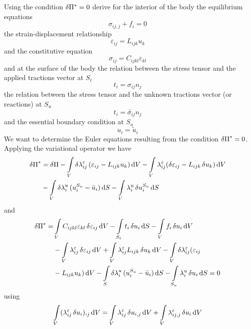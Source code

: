 Using the condition $\var{\Pi^*} = 0$ derive for the interior of the body the equilibrium equations
\[\sigma_{ij,j} + f_i = 0\]
the strain-displacement relationship
\[\varepsilon_{ij} = L_{ijk} u_k\]
and the constitutive equation
\[\sigma_{ij} = C_{ijkl} \varepsilon_{kl}\]
and at the surface of the body the relation between the stress tensor and the applied tractions vector at $S_t$
\[t_i = \sigma_{ij} n_j\]
the relation between the stress tensor and the unknown tractions vector (or reactions) at $S_u$
\[t_i = \tilde{\sigma_{ij}} n_j\]
and the essential boundary condition at $S_u$
\[u_i = \tilde{u}_i\]
We want to determine the Euler equations resulting from the condition $\var{\Pi}^* = 0$. Applying the variational operator we have
\begin{equation}
\begin{aligned}
\var{\Pi}^*& = \var{\Pi}  - \int\limits_V \var{\lambda}_{ij}^{\varepsilon}  (\varepsilon_{ij} - L_{ijk} u_k)\dd{V}- \int\limits_V \lambda_{ij}^\varepsilon (\var{\varepsilon}_{ij} - L_{ijk}\var{u}_k)\dd{V} \\
&-\int\limits_V \var{\lambda}_i^u (u_i^{S_u} - \bar u_i)\dd{S} - \int\limits_V \lambda _i^u \var{u}_i^{S_u} \dd{S}
\end{aligned}
\end{equation}
and
\begin{equation}
\begin{aligned}
\var{\Pi}^* =& \int\limits_V C_{ijkl} \varepsilon_{kl} \var{ \varepsilon}_{ij}\dd{V} - \int\limits_{S_t} t_i \var{u_i} \dd{S}  - \int\limits_V f_i \var{u_i}\dd{V}\\
  &- \int\limits_V \lambda_{ij}^{\varepsilon} \var{\varepsilon}_{ij}\dd{V}  + \int\limits_V \lambda_{ij}^{\varepsilon} L_{ijk}\var{u_k}\dd{V} - \int\limits_V \delta \lambda_{ij}^\varepsilon (\varepsilon_{ij}\\
  &- L_{ijk} u_k)\dd{V} - \int\limits_S \var{\lambda}_i^u (u_i^{S_u} - \bar {u}_i)\dd{S} - \int\limits_{S_u} \lambda _i^u\var{u_i}\dd{S} = 0
\end{aligned}
\end{equation}
using
\[\int\limits_V (\lambda_{ij}^\varepsilon \var{u_i}){,_j}\dd{V} =  \int\limits_V \lambda_{ij}^\varepsilon \var{u}_{i,j}\dd{V}  + \int\limits_V \lambda_{ij,j}^\varepsilon \var{u_i}\dd{V} \]

